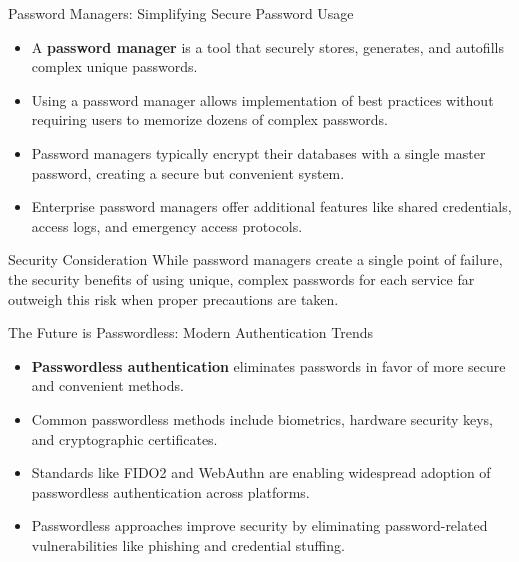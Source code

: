 \documentclass{beamer}
\begin{document}
\begin{frame}{Password Managers: Simplifying Secure Password Usage}
    \begin{itemize}
        \item A \textbf{password manager} is a tool that securely stores, generates, and autofills complex unique passwords.
        \item Using a password manager allows implementation of best practices without requiring users to memorize dozens of complex passwords.
        \item Password managers typically encrypt their databases with a single master password, creating a secure but convenient system.
        \item Enterprise password managers offer additional features like shared credentials, access logs, and emergency access protocols.
    \end{itemize}
    
    \begin{alertblock}{Security Consideration}
        While password managers create a single point of failure, the security benefits of using unique, complex passwords for each service far outweigh this risk when proper precautions are taken.
    \end{alertblock}
\end{frame}

\begin{frame}{The Future is Passwordless: Modern Authentication Trends}
    \begin{itemize}
        \item \textbf{Passwordless authentication} eliminates passwords in favor of more secure and convenient methods.
        \item Common passwordless methods include biometrics, hardware security keys, and cryptographic certificates.
        \item Standards like FIDO2 and WebAuthn are enabling widespread adoption of passwordless authentication across platforms.
        \item Passwordless approaches improve security by eliminating password-related vulnerabilities like phishing and credential stuffing.
    \end{itemize}
    
    \begin{center}
    \end{center}
\end{frame}
\end{document}

